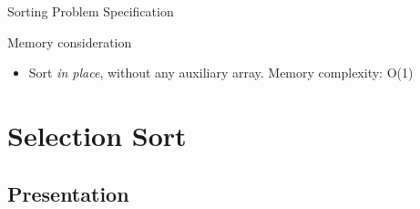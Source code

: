 \begin{frame}[squeeze]{Sorting Problem Specification}
  \begin{block}{Memory consideration}
    \begin{itemize}
    \item Sort \textit{in place}, without any auxiliary array.
      Memory complexity: O(1)
    \end{itemize}
  \end{block}
\end{frame}
\section{Selection Sort}
\subsection{Presentation}
